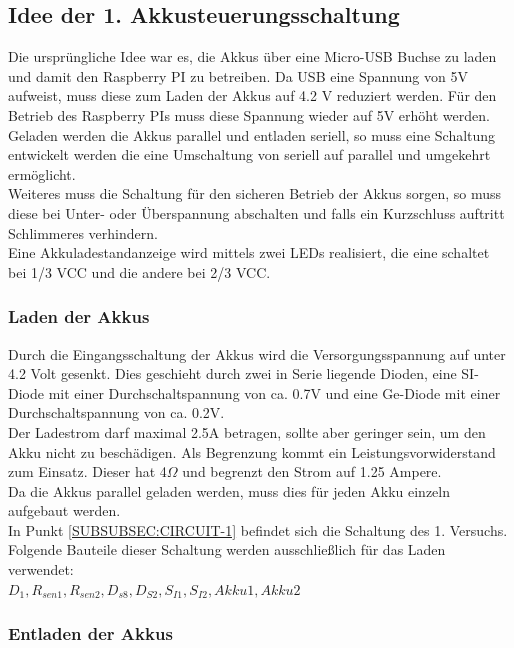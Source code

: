\documentclass[12pt,a4paper]{article}
\begin{document}
{\subsection{Idee der 1. Akkusteuerungsschaltung}
\label{SUBSEC:AKKUSTEUR1}

Die ursprüngliche Idee war es, die Akkus über eine Micro-USB Buchse zu laden und damit den Raspberry PI zu betreiben. Da USB eine Spannung von 5V aufweist, muss diese zum Laden der Akkus auf 4.2 V reduziert werden. Für den Betrieb des Raspberry PIs muss diese Spannung wieder auf 5V erhöht werden. \\
Geladen werden die Akkus parallel und entladen seriell, so muss eine Schaltung entwickelt werden die eine Umschaltung von seriell auf parallel und umgekehrt ermöglicht. \\
Weiteres muss die Schaltung für den sicheren Betrieb der Akkus sorgen, so muss diese bei Unter- oder Überspannung abschalten und falls ein Kurzschluss auftritt Schlimmeres verhindern. \\
Eine Akkuladestandanzeige wird mittels zwei LEDs realisiert, die eine schaltet bei 1/3 VCC und die andere bei 2/3 VCC. 

\subsubsection{Laden der Akkus}
\label{SUBSUBSEC:AKKULOAD1}

Durch die Eingangsschaltung der Akkus wird die Versorgungsspannung auf unter 4.2 Volt gesenkt. Dies geschieht durch zwei in Serie liegende Dioden, eine SI-Diode mit einer Durchschaltspannung von ca. 0.7V und eine Ge-Diode mit einer Durchschaltspannung von ca. 0.2V. \\
Der Ladestrom darf maximal 2.5A betragen, sollte aber geringer sein, um den Akku nicht zu beschädigen. Als Begrenzung kommt ein Leistungsvorwiderstand zum Einsatz. Dieser hat 4$\Omega$ und begrenzt den Strom auf 1.25 Ampere. \\
Da die Akkus parallel geladen werden, muss dies für jeden Akku einzeln aufgebaut werden. \\
In Punkt \ref{SUBSUBSEC:CIRCUIT-1} befindet sich die Schaltung des 1. Versuchs. Folgende Bauteile dieser Schaltung werden ausschließlich für das Laden verwendet:\\
 $D_1,R_{sen1},R_{sen2},D_{s8},D_{S2},S_{I1},S_{I2}, Akku1, Akku2$ \\


\subsubsection{Entladen der Akkus}
\label{SUBSUBSEC:AKKUENTLOAD1}

}
\end{document}
